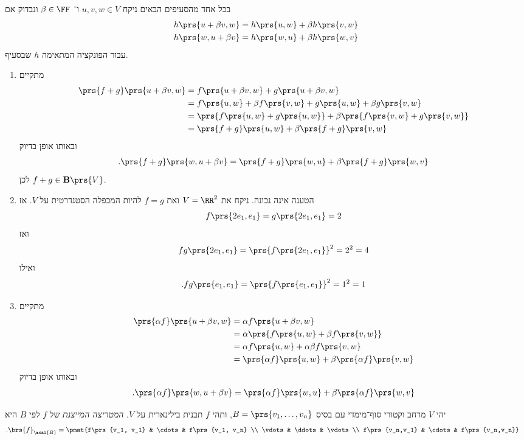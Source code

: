 \documentclass[a4paper,10pt,twoside,openany]{book}
\begin{document}
\begin{solution}
בכל אחד מהסעיפים הבאים ניקח
$u,v,w \in V$
ו־%
$\beta \in \FF$
ונבדוק אם
\begin{align*}
h\prs{u + \beta v, w} &= h\prs{u, w} + \beta h\prs{v,w} \\
h\prs{w, u+\beta v} &= h\prs{w, u} + \beta h\prs{w,v}
\end{align*}
עבור הפונקציה המתאימה
$h$
שבסעיף.
\begin{enumerate}
\item
מתקיים
\begin{align*}
\prs{f+g}\prs{u + \beta v, w} &= f\prs{u + \beta v, w} + g\prs{u + \beta v, w}
\\&=
f\prs{u, w} + \beta f\prs{v, w} + g\prs{u, w} + \beta g\prs{v,w}
\\&=
\prs{f\prs{u, w} + g\prs{u,w}} + \beta \prs{f\prs{v,w} + g\prs{v,w}}
\\&=
\prs{f+g}\prs{u, w} + \beta \prs{f+g}\prs{v,w}
\end{align*}
ובאותו אופן בדיוק
\begin{align*}
\text{.} \prs{f+g}\prs{w, u+\beta v} = \prs{f+g}\prs{w, u} + \beta \prs{f+g}\prs{w, v}
\end{align*}
לכן
$f+g \in \mathbf{B}\prs{V}$.

\item הטענה אינה נכונה. ניקח את
$V = \RR^2$
ואת
$f = g$
להיות המכפלה הסטנדרטית על
$V$.
אז
\[f\prs{2 e_1, e_1} = g\prs{2 e_1, e_1} = 2\]
ואז
\[fg\prs{2 e_1, e_1} = \prs{f\prs{2 e_1, e_1}}^2 = 2^2 = 4\]
ואילו
\[\text{.} fg\prs{e_1, e_1} = \prs{f\prs{e_1, e_1}}^2 = 1^2 = 1\]
\item מתקיים
\begin{align*}
\prs{\alpha f}\prs{u+\beta v, w} &= \alpha f\prs{u+\beta v, w}
\\&=
\alpha \prs{f\prs{u, w} + \beta f\prs{v, w}}
\\&=
\alpha f\prs{u,w} + \alpha \beta f\prs{v,w}
\\&=
\prs{\alpha f}\prs{u,w} + \beta \prs{\alpha f}\prs{v,w}
\end{align*}
ובאותו אופן בדיוק
\begin{align*}
\text{.} \prs{\alpha f}\prs{w, u+\beta v} = \prs{\alpha f}\prs{w, u} + \beta \prs{\alpha f}\prs{w, v}
\end{align*}
\end{enumerate}
\end{solution}

\begin{definition}
יהי
$V$
מרחב וקטורי סוף־מימדי עם בסיס
$B = \prs{v_1, \ldots, v_n}$,
ותהי
$f$
תבנית בילינארית על
$V$.
\emph{המטריצה המייצגת}
של
$f$
לפי
$B$
היא
\begin{align*}
\text{.} \brs{f}_\mcal{B} &= \pmat{f\prs{v_1, v_1} & \cdots & f\prs{v_1, v_n} \\ \vdots & \ddots & \vdots \\ f\prs{v_n,v_1} & \cdots & f\prs{v_n,v_n}}
\end{align*}
\end{definition}
\end{document}
